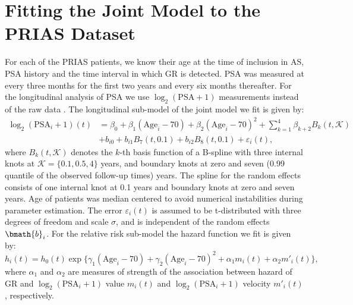 
\section{Fitting the Joint Model to the PRIAS Dataset}
\label{sec : param_estimates_jm_fit_prias}
For each of the PRIAS patients, we know their age at the time of inclusion in AS, PSA history and the time interval in which GR is detected. PSA was measured at every three months for the first two years and every six months thereafter. For the longitudinal analysis of PSA we use $\log_2 (\mbox{PSA} + 1)$ measurements instead of the raw data \citep{lin2000latent,pearson1994mixed}. The longitudinal sub-model of the joint model we fit is given by:
\begin{equation}
\label{eq : long_model_prias_web}
\begin{aligned}
\log_2 (\mbox{PSA}_i + 1)(t) &= \beta_0 + \beta_1 (\mbox{Age}_i-70) + \beta_2 (\mbox{Age}_i-70)^2 + \sum_{k=1}^4 \beta_{k+2} B_k(t,\mathcal{K})\\ 
&+  b_{i0} + b_{i1} B_7(t, 0.1) + b_{i2} B_8(t, 0.1) +
\varepsilon_i(t),
\end{aligned}
\end{equation}
where $B_k(t, \mathcal{K})$ denotes the $k$-th basis function of a B-spline with three internal knots at $\mathcal{K} =\{0.1, 0.5, 4\}$ years, and boundary knots at zero and seven (0.99 quantile of the observed follow-up times) years. The spline for the random effects consists of one internal knot at 0.1 years and boundary knots at zero and seven years. Age of patients was median centered to avoid numerical instabilities during parameter estimation. The error $\varepsilon_i(t)$ is assumed to be t-distributed with three degrees of freedom and scale $\sigma$, and is independent of the random effects $\bmath{b}_i$. For the relative risk sub-model the hazard function we fit is given by:
\begin{equation}
\label{eq : hazard_prias_web}
h_i(t) = h_0(t) \exp\big\{\gamma_1 (\mbox{Age}_i-70)  + \gamma_2 (\mbox{Age}_i-70)^2 + \alpha_1 m_i(t) + \alpha_2 m'_i(t)\big\},
\end{equation}
where $\alpha_1$ and $\alpha_2$ are measures of strength of the association between hazard of GR and $\log_2 (\mbox{PSA}_i + 1)$ value $m_i(t)$ and $\log_2 (\mbox{PSA}_i + 1)$ velocity $m'_i(t)$, respectively.

\clearpage

